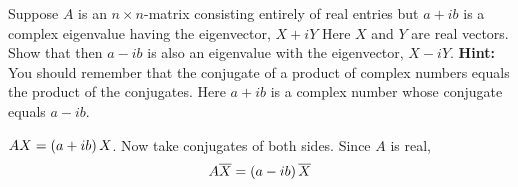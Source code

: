 \begin{enumialphparenastyle}
\begin{ex} Suppose $A$ is an $n\times n$-matrix consisting entirely of real
entries but $a+ib$ is a complex eigenvalue having the eigenvector, $X+iY$ Here $X$ and $Y$ are real vectors. Show
that then $a-ib$ is also an eigenvalue with the eigenvector, $X-iY$. \textbf{Hint: }You should remember that the conjugate of a
product of complex numbers equals the product of the conjugates. Here $a+ib$
is a complex number whose conjugate equals $a-ib$. 
\begin{sol}
 $AX=\left(
a+ib\right)X$. Now take conjugates of both sides. Since $A$ is
real,
\[
A\overline{X}=\left(a-ib\right) \overline{X}
\]
\end{sol}
\end{ex}

\end{enumialphparenastyle}